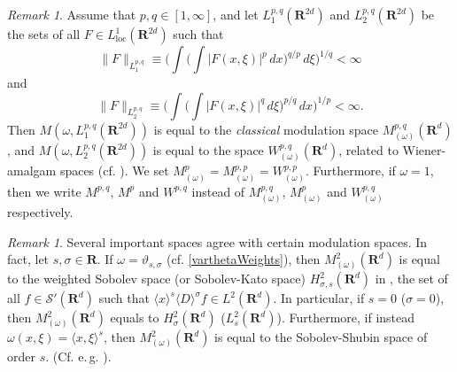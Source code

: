 \documentclass[12pt,a4paper,reqno]{amsart}
\numberwithin{equation}{section}
\numberwithin{thm}{section}
\theoremstyle{definition}
\theoremstyle{remark}
\newtheorem{rem}[thm]{Remark}
\begin{document}
\par

\begin{rem}
Assume that $p,q\in [1,\infty]$, and let $L^{p,q}_{1}({\mathbf R^{{2d}}})$ and
$L^{p,q}_{2}({\mathbf R^{{2d}}})$ be the sets of all $F\in  L^1_{\mathrm{loc}}
({\mathbf R^{{2d}}})$ such that
\begin{equation*}
\|F\|_{L^{p,q}_1}  \equiv \Big ( \int \Big( \int |F(x,\xi)|^p\,
dx\Big )^{q/p}\,d\xi \Big )^{1/q}
<\infty
\end{equation*}
and
\begin{equation*}
\|F\|_{L^{p,q}_2} \equiv \Big ( \int \Big ( \int |F(x,\xi)|^q\,
d\xi \Big )^{p/q}\, dx\Big )^{1/p}<\infty .
\end{equation*}
Then $M(\omega ,L^{p,q}_1({\mathbf R^{{2d}}}))$ is equal to the \emph{classical}
modulation
space $M^{p,q}_{(\omega)}({\mathbf R^{{d}}})$, and $M(\omega ,L^{p,q}_2({\mathbf R^{{2d}}}))$ is
equal to the space $W^{p,q}_{(\omega)}({\mathbf R^{{d}}})$, related to
Wiener-amalgam spaces (cf. \cite{F1,Feichtinger6,Feichtinger3,Gro-book}).
We
set $M^p_{(\omega )} = M^{p,p}_{(\omega
)}= W^{p,p}_{(\omega )}$. Furthermore, if $\omega =1$, then we write
$M^{p,q}$, $M^p$ and $W^{p,q}$ instead of $M^{p,q}_{(\omega )}$,
$M^p_{(\omega )}$ and $W^{p,q}_{(\omega )}$ respectively.
\end{rem}

\par

\begin{rem}\label{modspaceEx}
Several important spaces agree with certain modulation spaces. In fact, let
$s,\sigma \in \mathbf R$. If $\omega =\vartheta_{s,\sigma}$ (cf.
\eqref{varthetaWeights}), then $M^2_{(\omega )}({\mathbf R^{d}})$ is equal to the weighted
Sobolev space (or Sobolev-Kato space) $H^2_{\sigma ,s}({\mathbf R^{d}})$ in \cite{CoMa,Me},
the set of all $f\in \mathscr S'({\mathbf R^{d}})$ such that ${\langle x\rangle}^s{\langle D\rangle}^\sigma
f\in L^2({\mathbf R^{d}})$. In particular, if $s=0$ ($\sigma =0$), then
$M^2_{(\omega )}({\mathbf R^{d}})$ equals to $H^2_\sigma ({\mathbf R^{d}})$ ($L^2_s({\mathbf R^{d}})$).
Furthermore, if instead $\omega (x,\xi )={\langle {x,\xi }\rangle}^s$, then
$M^2_{(\omega )}({\mathbf R^{d}})$ is equal to the
Sobolev-Shubin space of order $s$. (Cf. e.{\,}g.  \cite{LuRa}).
\end{rem}

\par
\end{document}
